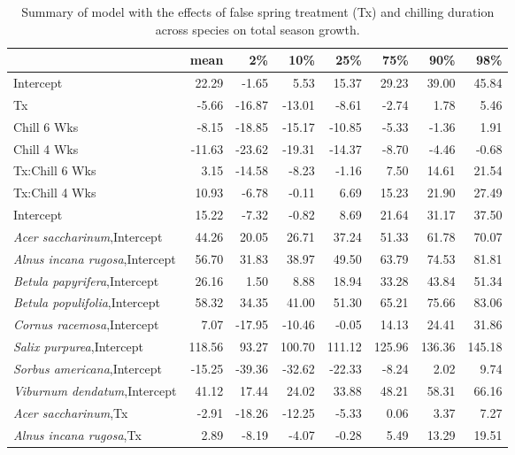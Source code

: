 \documentclass{article}\usepackage[]{graphicx}\usepackage[]{color}
\begin{document}
\newpage
\begin{longtable}{lrrrrrrr}
\caption{Summary of model with the effects of false spring treatment (Tx) and chilling duration across species on total season growth.} \\ 
  \hline
 & mean & 2\% & 10\% & 25\% & 75\% & 90\% & 98\% \\ 
  \hline \endhead  \hline
Intercept & 22.29 & -1.65 & 5.53 & 15.37 & 29.23 & 39.00 & 45.84 \\ 
  Tx & -5.66 & -16.87 & -13.01 & -8.61 & -2.74 & 1.78 & 5.46 \\ 
  Chill 6 Wks & -8.15 & -18.85 & -15.17 & -10.85 & -5.33 & -1.36 & 1.91 \\ 
  Chill 4 Wks & -11.63 & -23.62 & -19.31 & -14.37 & -8.70 & -4.46 & -0.68 \\ 
  Tx:Chill 6 Wks & 3.15 & -14.58 & -8.23 & -1.16 & 7.50 & 14.61 & 21.54 \\ 
  Tx:Chill 4 Wks & 10.93 & -6.78 & -0.11 & 6.69 & 15.23 & 21.90 & 27.49 \\ 
  Intercept & 15.22 & -7.32 & -0.82 & 8.69 & 21.64 & 31.17 & 37.50 \\ 
  \textit{Acer saccharinum},Intercept & 44.26 & 20.05 & 26.71 & 37.24 & 51.33 & 61.78 & 70.07 \\ 
  \textit{Alnus incana rugosa},Intercept & 56.70 & 31.83 & 38.97 & 49.50 & 63.79 & 74.53 & 81.81 \\ 
  \textit{Betula papyrifera},Intercept & 26.16 & 1.50 & 8.88 & 18.94 & 33.28 & 43.84 & 51.34 \\ 
  \textit{Betula populifolia},Intercept & 58.32 & 34.35 & 41.00 & 51.30 & 65.21 & 75.66 & 83.06 \\ 
  \textit{Cornus racemosa},Intercept & 7.07 & -17.95 & -10.46 & -0.05 & 14.13 & 24.41 & 31.86 \\ 
  \textit{Salix purpurea},Intercept & 118.56 & 93.27 & 100.70 & 111.12 & 125.96 & 136.36 & 145.18 \\ 
  \textit{Sorbus americana},Intercept & -15.25 & -39.36 & -32.62 & -22.33 & -8.24 & 2.02 & 9.74 \\ 
  \textit{Viburnum dendatum},Intercept & 41.12 & 17.44 & 24.02 & 33.88 & 48.21 & 58.31 & 66.16 \\ 
  \textit{Acer saccharinum},Tx & -2.91 & -18.26 & -12.25 & -5.33 & 0.06 & 3.37 & 7.27 \\ 
  \textit{Alnus incana rugosa},Tx & 2.89 & -8.19 & -4.07 & -0.28 & 5.49 & 13.29 & 19.51 \\ 

\end{longtable}
\end{document}
